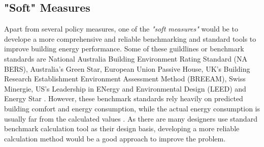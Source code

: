 
		\subsection{"Soft" Measures}
			Apart from several policy measures, one of the \textit{"soft measures"} would be to develope a more comprehensive and reliable benchmarking and standard tools to improve building energy performance. Some of these guildlines or benchmark standards are National Australia Building Environment Rating Standard (NA BERS), Australia's Green Star, European Union Passive House, UK's Building Research Establishment Environment Assessment Method (BREEAM), Swiss Minergie, US's Leadership in ENergy and Environmental Design (LEED) and Energy Star \cite{ZOU2018165}. However, these benchmark standards rely heavily on predicted building comfort and energy consumption, while the actual energy consumption is usually far from the calculated values \cite{tuohy2015closing}. As there are many designers use standard benchmark calculation tool as their design basis, developing a more reliable calculation method would be a good approach to improve the problem.

